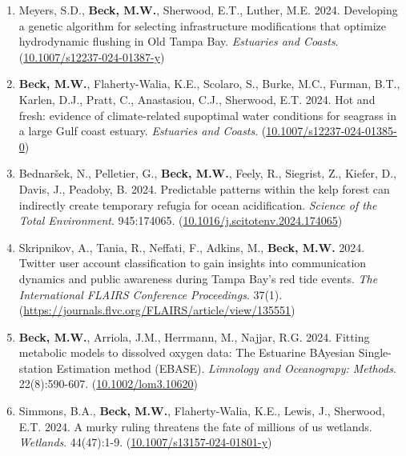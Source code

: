 \documentclass[letterpaper,12pt]{article}
\begin{document}
\begin{enumerate}

\item Meyers, S.D., \textbf{Beck, M.W.}, Sherwood, E.T., Luther, M.E. 2024. Developing a genetic algorithm for selecting infrastructure modifications that optimize hydrodynamic flushing in Old Tampa Bay. \textit{Estuaries and Coasts}. ({\footnotesize\href{https://doi.org/10.1007/s12237-024-01387-y}{10.1007/s12237-024-01387-y}})

\item \textbf{Beck, M.W.}, Flaherty-Walia, K.E., Scolaro, S., Burke, M.C., Furman, B.T., Karlen, D.J., Pratt, C., Anastasiou, C.J., Sherwood, E.T. 2024. Hot and fresh: evidence of climate-related supoptimal water conditions for seagrass in a large Gulf coast estuary. \textit{Estuaries and Coasts}. ({\footnotesize\href{https://doi.org/10.1007/s12237-024-01385-0}{10.1007/s12237-024-01385-0}}) 

\item Bednar\v{s}ek, N., Pelletier, G., \textbf{Beck, M.W.}, Feely, R., Siegrist, Z., Kiefer, D., Davis, J., Peadoby, B. 2024. Predictable patterns within the kelp forest can indirectly create temporary refugia for ocean acidification. \textit{Science of the Total Environment}. 945:174065. ({\footnotesize\href{https://doi.org/10.1016/j.scitotenv.2024.174065}{10.1016/j.scitotenv.2024.174065}}) 

\item Skripnikov, A., Tania, R., Neffati, F., Adkins, M., \textbf{Beck, M.W.} 2024. Twitter user account classification to gain insights into communication dynamics and public awareness during Tampa Bay's red tide events. \textit{The International FLAIRS Conference Proceedings}. 37(1). ({\footnotesize\href{https://journals.flvc.org/FLAIRS/article/view/135551}{https://journals.flvc.org/FLAIRS/article/view/135551}}) 

\item \textbf{Beck, M.W.}, Arriola, J.M., Herrmann, M., Najjar, R.G. 2024. Fitting metabolic models to dissolved oxygen data: The Estuarine BAyesian Single-station Estimation method (EBASE). \textit{Limnology and Oceanograpy: Methods}. 22(8):590-607. ({\footnotesize\href{https://doi.org/10.1002/lom3.10620}{10.1002/lom3.10620}})

\item Simmons, B.A., \textbf{Beck, M.W.}, Flaherty-Walia, K.E., Lewis, J., Sherwood, E.T. 2024. A murky ruling threatens the fate of millions of us wetlands. \textit{Wetlands}. 44(47):1-9. ({\footnotesize\href{https://doi.org/10.1007/s13157-024-01801-y}{10.1007/s13157-024-01801-y}})


\end{enumerate}
\end{document}
